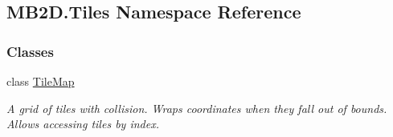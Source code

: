 \hypertarget{namespace_m_b2_d_1_1_tiles}{}\subsection{M\+B2\+D.\+Tiles Namespace Reference}
\label{namespace_m_b2_d_1_1_tiles}
\subsubsection*{Classes}
\begin{DoxyCompactItemize}
\item 
class \hyperlink{class_m_b2_d_1_1_tiles_1_1_tile_map}{Tile\+Map}
\begin{DoxyCompactList}\small\item\em A grid of tiles with collision. Wraps coordinates when they fall out of bounds. Allows accessing tiles by index. \end{DoxyCompactList}\end{DoxyCompactItemize}
